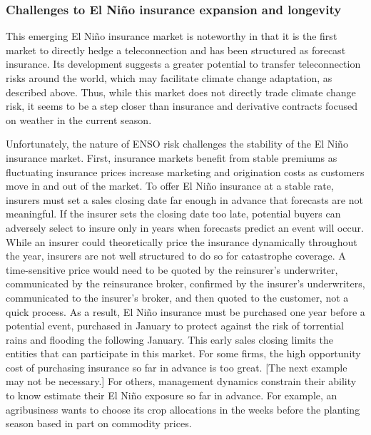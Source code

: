 \documentclass[authoryear]{article}
\begin{document}
\subsubsection{Challenges to El Ni\~no insurance expansion and longevity}
This emerging El Ni\~no insurance market is noteworthy in that it is the first market to directly hedge a teleconnection and has been structured as forecast insurance. Its development suggests a greater potential to transfer teleconnection risks around the world, which may facilitate climate change adaptation, as described above. Thus, while this market does not directly trade climate change risk, it seems to be a step closer than insurance and derivative contracts focused on weather in the current season. 

Unfortunately, the nature of ENSO risk challenges the stability of the El Ni\~no insurance market. First, insurance markets benefit from stable premiums as fluctuating insurance prices increase marketing and origination costs as customers move in and out of the market. To offer El Ni\~no insurance at a stable rate, insurers must set a sales closing date far enough in advance that forecasts are not meaningful. If the insurer sets the closing date too late, potential buyers can adversely select to insure only in years when forecasts predict an event will occur. While an insurer could theoretically price the insurance dynamically throughout the year, insurers are not well structured to do so for catastrophe coverage. A time-sensitive price would need to be quoted by the reinsurer's underwriter, communicated by the reinsurance broker, confirmed by the insurer's underwriters, communicated to the insurer's broker, and then quoted to the customer, not a quick process. 
As a result, El Ni\~no insurance must be purchased one year before a potential event, purchased in January to protect against the risk of torrential rains and flooding the following January. This early sales closing limits the entities that can participate in this market. For some firms, the high opportunity cost of purchasing insurance so far in advance is too great. [The next example may not be necessary.] For others, management dynamics constrain their ability to know estimate their El Ni\~no exposure so far in advance. For example, an agribusiness wants to choose its crop allocations in the weeks before the planting season based in part on commodity prices.
\end{document}
